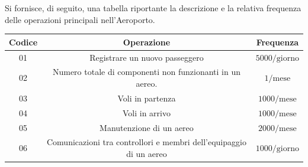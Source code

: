 
\textsf{\small Si fornisce, di seguito, una tabella riportante la descrizione e la relativa frequenza delle operazioni principali nell'Aeroporto.}\\

\begin{tabular}{ | c c c |} %
	\hline
	\textbf{Codice} & \textbf{Operazione} & \textbf{Frequenza} \\
	\hline
	\textsf{\small 01} & \textsf{\small Registrare un nuovo passeggero} & \textsf{\small $5000/\text{giorno}$} \\ %
	\hline
	\textsf{\small 02} & \textsf{\small  Numero totale di componenti non funzionanti in un aereo.} & \textsf{\small $ 1/\text{mese} $} \\ %
	\hline
	\textsf{\small 03} & \textsf{\small Voli in partenza} & \textsf{\small $ 1000 / \text{mese} $} \\
	\hline
	\textsf{\small 04} & \textsf{\small Voli in arrivo} & \textsf{\small $ 1000 / \text{mese} $} \\
	\hline
	\textsf{\small 05} & \textsf{\small Manutenzione di un aereo} & \textsf{\small $ 2000 / \text{mese} $} \\
	\hline
	\textsf{\small 06} & \textsf{\small Comunicazioni tra controllori e membri dell'equipaggio di un aereo} & \textsf{\small $ 1000 / \text{giorno} $} \\
	

\end{tabular}
